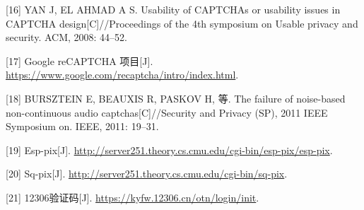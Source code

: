 \documentclass[bachelor,zhspacing]{cqu}  %
\begin{document}
\hypertarget{ref-yan2008usability}{}
{[}16{]} YAN J, EL AHMAD A S. Usability of CAPTCHAs or usability issues
in CAPTCHA design{[}C{]}//Proceedings of the 4th symposium on Usable
privacy and security. ACM, 2008: 44--52.

\hypertarget{ref-googlerecaptcha}{}
{[}17{]} Google reCAPTCHA 项目{[}J{]}.
\url{https://www.google.com/recaptcha/intro/index.html}.

\hypertarget{ref-bursztein2011failure}{}
{[}18{]} BURSZTEIN E, BEAUXIS R, PASKOV H, 等. The failure of
noise-based non-continuous audio captchas{[}C{]}//Security and Privacy
(SP), 2011 IEEE Symposium on. IEEE, 2011: 19--31.

\hypertarget{ref-esp-pix}{}
{[}19{]} Esp-pix{[}J{]}.
\url{http://server251.theory.cs.cmu.edu/cgi-bin/esp-pix/esp-pix}.

\hypertarget{ref-sq-pix}{}
{[}20{]} Sq-pix{[}J{]}.
\url{http://server251.theory.cs.cmu.edu/cgi-bin/sq-pix}.

\hypertarget{ref-captcha12306}{}
{[}21{]} 12306验证码{[}J{]}. \url{https://kyfw.12306.cn/otn/login/init}.

%




\end{document}
